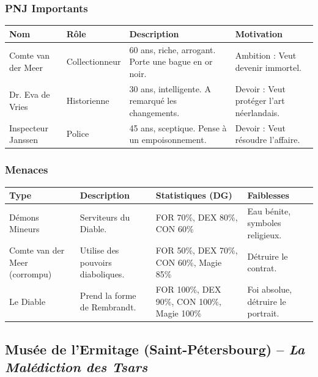 \documentclass[10pt,a5paper,twoside]{book}
\begin{document}
\newpage

\subsubsection*{PNJ Importants}
\begin{center}
	\begin{tabular}{|P{2cm}|P{3cm}|P{3.5cm}|P{2.5cm}|}
	\hline
	\textbf{Nom} 		& \textbf{Rôle} 	& \textbf{Description} 									& \textbf{Motivation} \\ \hline
	Comte van der Meer 	& Collectionneur 	& 60 ans, riche, arrogant. Porte une bague en or noir. 	& Ambition : Veut devenir immortel. \\ \hline
	Dr. Eva de Vries 	& Historienne 		& 30 ans, intelligente. A remarqué les changements. 	& Devoir : Veut protéger l'art néerlandais. \\ \hline
	Inspecteur Janssen 	& Police 			& 45 ans, sceptique. Pense à un empoisonnement. 		& Devoir : Veut résoudre l'affaire. \\ \hline
	\end{tabular}
\end{center}

\subsubsection*{Menaces}

\begin{center}
	\begin{tabular}{|P{2cm}|P{3cm}|P{3.5cm}|P{2.5cm}|}
	\hline
	\textbf{Type} 					& \textbf{Description} 				& \textbf{Statistiques (DG)} 					& \textbf{Faiblesses} \\ \hline
	Démons Mineurs 					& Serviteurs du Diable. 			& FOR 70\%, DEX 80\%, CON 60\% 					& Eau bénite, symboles religieux. \\ \hline
	Comte van der Meer (corrompu) 	& Utilise des pouvoirs diaboliques. & FOR 50\%, DEX 70\%, CON 60\%, Magie 85\% 		& Détruire le contrat. \\ \hline
	Le Diable 						& Prend la forme de Rembrandt. 		& FOR 100\%, DEX 90\%, CON 100\%, Magie 100\% 	& Foi absolue, détruire le portrait. \\ \hline
	\end{tabular}
\end{center}

\newpage

\subsection{Musée de l'Ermitage (Saint-Pétersbourg) -- \newline \textit{La Malédiction des Tsars}}
\end{document}
